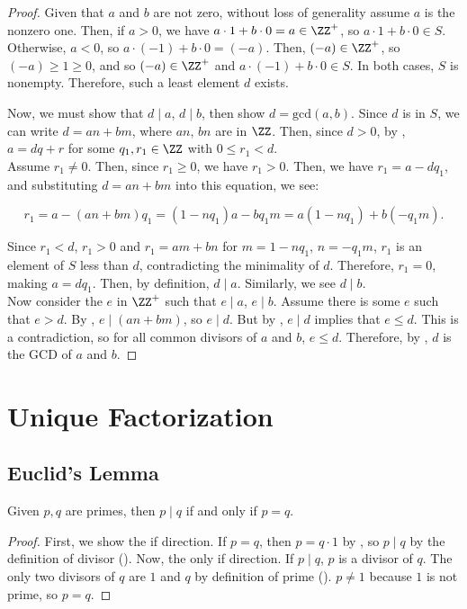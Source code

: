 \begin{proof}
    Given that $a$ and $b$ are not zero, without loss of generality assume $a$ is the nonzero one. Then, if $a > 0$, we have $a \cdot 1 + b \cdot 0 = a \in \ZZ^+$, so $a \cdot 1 + b \cdot 0 \in S$. Otherwise, $a <0$, so $a \cdot (-1) + b \cdot 0 = (-a)$. Then, $(-a) \in \ZZ^+$, so $(-a) \ge 1 \ge 0$, and so $(-a) \in \ZZ^+$ and $a \cdot (-1) + b \cdot 0 \in S$. In both cases, $S$ is nonempty. Therefore, such a least element $d$ exists. 
    
     Now, we must show that $d \mid a$, $d \mid b$, then show $d = \text{gcd} (a,b)$. Since $d$ is in $S$, we can write $d = an + bm$, where $an$, $bn$ are in $\ZZ$. Then, since $d>0$, by , $a=dq+r$ for some $q_1, r_1 \in \ZZ$ with $0 \leq r_1 < d$. \\
     
     Assume $r_1 \neq 0$. Then, since $r_1 \ge 0$, we have $r_1 > 0$. Then, we have $r_1=a-dq_1$, and substituting $d = an + bm$ into this equation, we see:
     
     \begin{equation*}
         r_1=a-(an + bm)q_1 = (1-nq_1)a-bq_1m = a(1-nq_1)+b(-q_1m).
     \end{equation*}
     
     Since $r_1<d$, $r_1 > 0$ and $r_1 = am+bn$ for $m = 1-nq_1$, $n = -q_1m$, $r_1$ is an element of $S$ less than $d$, contradicting the minimality of $d$. Therefore, $r_1 = 0$, making $a=dq_1$. Then, by definition, $d \mid a$. Similarly, we see $d \mid b$. \\

    Now consider the $e$ in $\ZZ^+$ such that $e \mid a$, $e \mid b$. Assume there is some $e$ such that $e > d$. By , $e \mid (an+bm)$, so $e \mid d$. But by , $e \mid d$ implies that $e \leq d$. This is a contradiction, so for all common divisors of $a$ and $b$, $e\le d$. Therefore, by , $d$ is the GCD of $a$ and $b$. 
\end{proof}
    
\newpage
\section{Unique Factorization}

\subsection{Euclid's Lemma}
\begin{lemma}\label{prime_div_prime}
    Given $p,q$ are primes, then $p\mid q$ if and only if $p=q$.
\end{lemma}
\begin{proof} First, we show the if direction. If $p=q$, then $p=q\cdot 1$ by , so $p\mid q$ by the definition of divisor (). Now, the only if direction. If $p\mid q$, $p$ is a divisor of $q$. The only two divisors of $q$ are $1$ and $q$ by definition of prime (). $p\neq 1$ because $1$ is not prime, so $p=q$.
\end{proof}

